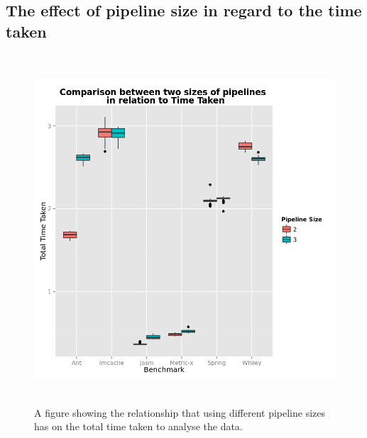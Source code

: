 \begin{appendices}
\chapter{The effect of pipeline size in regard to the time taken}
\begin{figure}[h]
\centering
\includegraphics[width=\textwidth,height=13cm]{PipelineTime.png}
\caption{A figure showing the relationship that using different pipeline sizes has on the total time taken to analyse the data.}
\label{fig:pipelinetime}
\end{figure}


\end{appendices}
